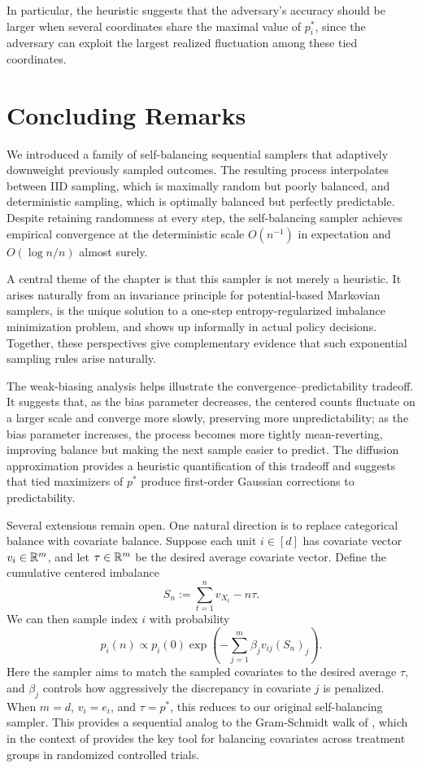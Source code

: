 In particular, the heuristic suggests that the adversary's accuracy should be larger
 when several coordinates share the maximal value of $p_i^*$, since the adversary can exploit the largest realized fluctuation among these tied coordinates.

\section{Concluding Remarks}

We introduced a family of self-balancing sequential samplers that adaptively downweight previously 
sampled outcomes. The resulting process interpolates between IID sampling, which is maximally 
random but poorly balanced, and deterministic sampling, which is optimally balanced but perfectly 
predictable. Despite retaining randomness at every step, the self-balancing sampler achieves empirical
 convergence at the deterministic scale \(O(n^{-1})\) in expectation and \(O(\log n/n)\) almost surely.

A central theme of the chapter is that this sampler is not merely a heuristic. 
It arises naturally from an invariance principle for potential-based Markovian samplers, 
is the unique solution to a one-step entropy-regularized imbalance minimization problem, 
and shows up informally in actual policy decisions. Together, these perspectives give complementary 
evidence that such exponential sampling rules arise naturally.

The weak-biasing analysis helps illustrate the convergence--predictability tradeoff. It suggests 
that, as the bias parameter decreases, the centered counts fluctuate on a larger scale and converge more 
slowly, preserving more unpredictability; as the bias parameter increases, the process becomes more 
tightly mean-reverting, improving balance but making the next sample easier to predict. The diffusion approximation provides a heuristic quantification of this tradeoff and suggests that tied maximizers of \(p^*\) produce first-order Gaussian corrections to predictability.

Several extensions remain open. One natural direction is to replace categorical balance with covariate
balance. Suppose each unit $i \in [d]$ has covariate vector $v_i\in\mathbb{R}^m$, and let $\tau\in\mathbb{R}^m$ be the
desired average covariate vector. Define the cumulative centered imbalance
%
    \[S_n := \sum_{t=1}^n v_{X_t} - n\tau.\]
%
\noindent We can then sample index $i$ with probability
%
    \[p_i(n) \propto p_i(0)\exp\left(-\sum_{j=1}^m \beta_j v_{ij} (S_n)_j\right).\]
%
\noindent Here the sampler aims to match the sampled covariates to the desired average $\tau$, and 
$\beta_j$ controls how aggressively the discrepancy in covariate $j$ is penalized. 
When $m=d$, $v_i=e_i$, and $\tau=p^*$, this reduces to our original self-balancing sampler.
This provides a sequential analog to the Gram-Schmidt walk of \cite{bansal2019_gram_schmidt_walk}, which in the context of \cite{harshaw2024_gram_schmidt_walk_design} provides the key tool for balancing covariates across treatment groups in randomized controlled trials.

